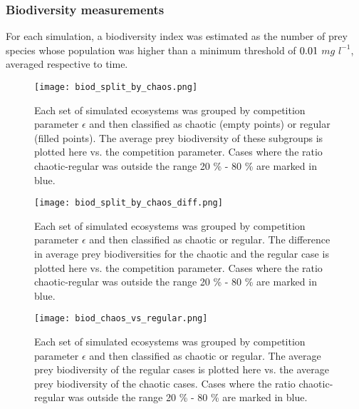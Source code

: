 \subsubsection{Biodiversity measurements}
\label{subsubsec:BiodiversityFigs}

For each simulation, a biodiversity index was estimated as the number of prey species whose population was higher than a minimum threshold of $0.01$ $mg$ $l^{-1}$, averaged respective to time.

\begin{figure}[H]
	\begin{center}
		\texttt{[image: biod\_split\_by\_chaos.png]}
	\end{center}
	\caption{Each set of simulated ecosystems was grouped by competition parameter $\epsilon$ and then classified as chaotic (empty points) or regular (filled points). The average prey biodiversity of these subgroups is plotted here vs. the competition parameter. Cases where the ratio chaotic-regular was outside the range 20 \% - 80 \% are marked in blue.}
	\label{fig:BiodSplitByChaos}
\end{figure}

\begin{figure}[H]
	\begin{center}
		\texttt{[image: biod\_split\_by\_chaos\_diff.png]}
	\end{center}
	\caption{Each set of simulated ecosystems was grouped by competition parameter $\epsilon$ and then classified as chaotic or regular. The difference in average prey biodiversities for the chaotic and the regular case is plotted here vs. the competition parameter. Cases where the ratio chaotic-regular was outside the range 20 \% - 80 \% are marked in blue.}
	\label{fig:BiodSplitByChaosDiff}
\end{figure}

\begin{figure}[H]
	\begin{center}
		\texttt{[image: biod\_chaos\_vs\_regular.png]}
	\end{center}
	\caption{Each set of simulated ecosystems was grouped by competition parameter $\epsilon$ and then classified as chaotic or regular. The average prey biodiversity of the regular cases is plotted here vs. the average prey biodiversity of the chaotic cases. Cases where the ratio chaotic-regular was outside the range 20 \% - 80 \% are marked in blue.}
	\label{fig:BiodChaosVsRegular}
\end{figure}

